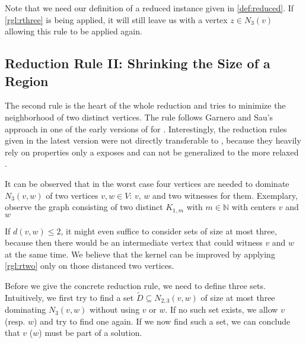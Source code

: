 Note that we need our definition of a reduced instance given in \ref{def:reduced}. If \cref{rgl:rthree} is being applied, it will still leave us with a vertex $z\in N_3(v)$ allowing this rule to be applied again.

\subsection{Reduction Rule II: Shrinking the Size of a Region}

The second rule is the heart of the whole reduction and tries to minimize the neighborhood of two distinct vertices. The rule follows Garnero and Sau's approach in one of the early versions of \cite{Garnero2014} for \ptdom. Interestingly, the reduction rules given in the latest version were not directly transferable to \psdom, because they heavily rely on properties only a \ptdom exposes and can not be generalized to the more relaxed \psdom.





It can be observed that in the worst case four vertices are needed to dominate $N_3(v,w)$ of two vertices $v,w \in V$: $v$, $w$ and two witnesses for them. Exemplary, observe the graph consisting of two distinct $K_{1,m}$ with $m \in \mathbb{N}$ with centers $v$ and $w$

If $d(v,w) \leq 2$, it might even suffice to consider sets of size at most three, because then there would be an intermediate vertex that could witness $v$ and $w$ at the same time. We believe that the kernel can be improved by applying \cref{rgl:rtwo} only on those distanced two vertices. 

Before we give the concrete reduction rule, we need to define three sets. Intuitively, we first try to find a set $\tilde D \subseteq N_{2,3}(v,w)$ of size at most three dominating $N_3(v,w)$ without using $v$ or $w$. If no such set exists, we allow $v$ (resp. $w$) and try to find one again. If we now find such a set, we can conclude that $v$ ($w$) must be part of a solution.

